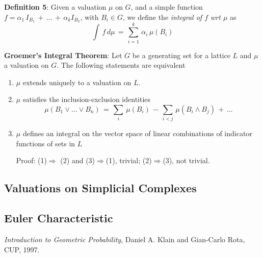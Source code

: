 \documentclass[12pt]{amsart}
\begin{document}
\textbf{Definition 5}: Given a valuation $\mu$ on $G$, and a simple function 
$f=\alpha_1\,I_{B_1}\,+\,\dots\,+\,\alpha_kI_{B_k}$, with $B_i\in G$, we define the
\textit{integral of $f$ wrt $\mu$} as 
\[
\int\,f\,d\mu\,=\,\sum_{i=1}^k\,\alpha_i\,\mu(B_i)
\] 

\textbf{Groemer's Integral Theorem}: Let $G$ be a generating set for a lattice $L$ and $\mu$ a valuation on $G$. The following statements are equivalent
\begin{enumerate}
\item $\mu$ extends uniquely to a valuation on $L$.
\item $\mu$ satisfies the inclusion-exclusion identities
\[
\mu(B_1\vee\dots\vee B_n)\,=\,\sum_i\,\mu(B_i)\,-\,\sum_{i<j}\,\mu(B_i\wedge B_j)\,+\,\dots
\]
\item $\mu$ defines an integral on the vector space of linear combinations of indicator functions of sets in $L$

Proof: (1)$\Rightarrow$ (2) and (3)$\Rightarrow$(1), trivial; (2)$\Rightarrow$(3), not trivial.

\end{enumerate}

\subsection{Valuations on Simplicial Complexes}
\subsection{Euler Characteristic}


\begin{thebibliography}{99}
 {\sl Introduction to Geometric Probability}, Daniel A. Klain and Gian-Carlo Rota, CUP, 1997.
\end{thebibliography}
\end{document}
